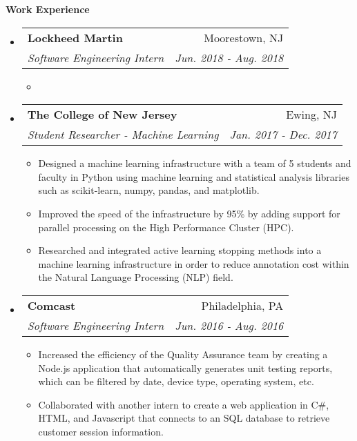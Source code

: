 \documentclass[letterpaper,10pt]{article}
\makeatletter
\newcommand{\resitem}[1]{\item #1 \vspace{-2pt}}
\newcommand{\resheading}[1]{{\large \colorbox{mygrey}{\begin{minipage}{\textwidth}{\textbf{#1 \vphantom{p\^{E}}}}\end{minipage}}}}
\newcommand{\ressubheading}[4]{
\begin{tabular*}{7.0in}{l@{\extracolsep{\fill}}r}
		\textbf{#1} & #2 \\
		\textit{#3} & \textit{#4} \\
\end{tabular*}\vspace{-6pt}}
\makeatother
\begin{document}
\resheading{Work Experience}
\begin{itemize}

\item
	\ressubheading{Lockheed Martin}{Moorestown, NJ}{Software Engineering Intern}{Jun. 2018 - Aug. 2018}
	\begin{itemize}
		\resitem{}
		\end{itemize}	
\item
	\ressubheading{The College of New Jersey}{Ewing, NJ}{Student Researcher - Machine Learning}{Jan. 2017 - Dec. 2017}
	\begin{itemize}
		\resitem{Designed a machine learning infrastructure with a team of 5 students and faculty in Python using machine learning and statistical analysis libraries such as scikit-learn, numpy, pandas, and matplotlib.}
		\resitem{Improved the speed of the infrastructure by 95\% by adding support for parallel processing on the High Performance Cluster (HPC).}
		\resitem{Researched and integrated active learning stopping methods into a machine learning infrastructure in order to reduce annotation cost within the Natural Language Processing (NLP) field.}
		\end{itemize}
		
\item
	\ressubheading{Comcast}{Philadelphia, PA}{Software Engineering Intern}{Jun. 2016 - Aug. 2016}
	\begin{itemize}
		\resitem{Increased the efficiency of the Quality Assurance team by creating a Node.js application that automatically generates unit testing reports, which can be filtered by date, device type, operating system, etc.}
		\resitem{Collaborated with another intern to create a web application in C\#, HTML, and Javascript that connects to an SQL database to retrieve customer session information.}
	\end{itemize}
\end{itemize}
\end{document}
